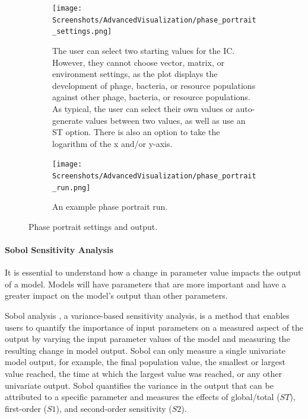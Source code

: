 \begin{figure}[h!]
    \centering
    \begin{subfigure}{0.49\linewidth}
        \centering
        \captionsetup{width=1\linewidth}
        \texttt{[image: Screenshots/AdvancedVisualization/phase\_portrait\_settings.png]}
        \caption{
            The user can select two starting values for the IC. 
            However, they cannot choose vector, matrix, or environment settings, as the plot displays the development of phage, bacteria, or resource populations against other phage, bacteria, or resource populations.
            As typical, the user can select their own values or auto-generate values between two values, as well as use an ST option.
            There is also an option to take the logarithm of the x and/or y-axis. 
        }
        \label{fig:ss:av:phase_portrait_settings}
    \end{subfigure}
    \hfill
    \begin{subfigure}{0.49\linewidth}
        \centering
        \captionsetup{width=1\linewidth}
        \texttt{[image: Screenshots/AdvancedVisualization/phase\_portrait\_run.png]}
        \caption{
            An example phase portrait run. 
        }
        \label{fig:ss:av:phase_portrait_run}
    \end{subfigure}
    \caption{Phase portrait settings and output. }
\end{figure}

\paragraph{Sobol Sensitivity Analysis}
\label{sec:Sobol_sensitivity_analysis}
It is essential to understand how a change in parameter value impacts the output of a model. 
Models will have parameters that are more important and have a greater impact on the model’s output than other parameters. 

Sobol analysis \cite{sobolGlobalSensitivityIndices2001}, a variance-based sensitivity analysis, is a method that enables users to quantify the importance of input parameters on a measured aspect of the output by varying the input parameter values of the model and measuring the resulting change in model output.
Sobol can only measure a single univariate model output, for example, the final population value, the smallest or largest value reached, the time at which the largest value was reached, or any other univariate output. 
Sobol quantifies the variance in the output that can be attributed to a specific parameter and measures the effects of global/total ($ST$), first-order ($S1$), and second-order sensitivity ($S2$). 

